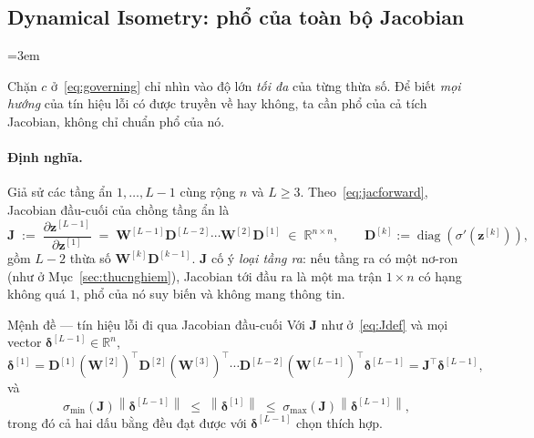 \subsection{Dynamical Isometry: phổ của toàn bộ Jacobian}
\label{subsec:dyniso}
{\emergencystretch=3em

Chặn $c$ ở~\eqref{eq:governing} chỉ nhìn vào độ lớn \emph{tối đa} của từng thừa số.
Để biết \emph{mọi hướng} của tín hiệu lỗi có được truyền về hay không, ta cần phổ
của cả tích Jacobian, không chỉ chuẩn phổ của nó.

\paragraph{Định nghĩa.} Giả sử các tầng ẩn $1,\dots,L-1$ cùng rộng $n$ và $L\ge3$.
Theo~\eqref{eq:jacforward}, Jacobian đầu-cuối của chồng tầng ẩn là
\begin{equation}
  \mathbf{J}
  \;:=\; \frac{\partial\mathbf{z}^{[L-1]}}{\partial\mathbf{z}^{[1]}}
  \;=\; \mathbf{W}^{[L-1]}\mathbf{D}^{[L-2]}\cdots\mathbf{W}^{[2]}\mathbf{D}^{[1]}
  \;\in\;\mathbb{R}^{n\times n},
  \qquad
  \mathbf{D}^{[k]} := \operatorname{diag}\!\left(\sigma'\!\left(\mathbf{z}^{[k]}\right)\right),
  \label{eq:Jdef}
\end{equation}
gồm $L-2$ thừa số $\mathbf{W}^{[k]}\mathbf{D}^{[k-1]}$. $\mathbf{J}$ cố ý
\emph{loại tầng ra}: nếu tầng ra có một nơ-ron (như ở Mục~\ref{sec:thucnghiem}),
Jacobian tới đầu ra là một ma trận $1\times n$ có hạng không quá $1$, phổ của nó
suy biến và không mang thông tin.

\begin{infobox}{Mệnh đề --- tín hiệu lỗi đi qua Jacobian đầu-cuối}
Với $\mathbf{J}$ như ở~\eqref{eq:Jdef} và mọi vector $\boldsymbol{\delta}^{[L-1]}\in\mathbb{R}^{n}$,
\begin{equation}
  \boldsymbol{\delta}^{[1]}
  = \mathbf{D}^{[1]}\left(\mathbf{W}^{[2]}\right)^{\!\top}\mathbf{D}^{[2]}\left(\mathbf{W}^{[3]}\right)^{\!\top}
    \cdots\mathbf{D}^{[L-2]}\left(\mathbf{W}^{[L-1]}\right)^{\!\top}\boldsymbol{\delta}^{[L-1]}
  = \mathbf{J}^{\!\top}\boldsymbol{\delta}^{[L-1]},
  \label{eq:deltaJ}
\end{equation}
và
\begin{equation}
  \sigma_{\min}(\mathbf{J})\left\|\boldsymbol{\delta}^{[L-1]}\right\|
  \;\le\;\left\|\boldsymbol{\delta}^{[1]}\right\|
  \;\le\;\sigma_{\max}(\mathbf{J})\left\|\boldsymbol{\delta}^{[L-1]}\right\| ,
  \label{eq:twoside}
\end{equation}
trong đó cả hai dấu bằng đều đạt được với $\boldsymbol{\delta}^{[L-1]}$ chọn
thích hợp.
\end{infobox}

}
